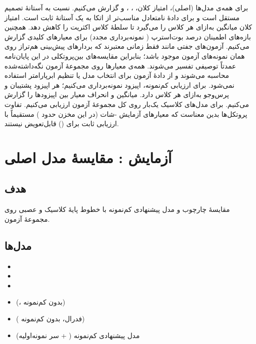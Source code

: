 برای همه‌ی مدل‌ها  (اصلی)، امتیاز  کلان، ، ،  و  گزارش می‌کنیم.  نسبت به آستانۀ تصمیم مستقل است و برای دادۀ نامتعادل مناسب‌تر از اتکا به یک آستانۀ ثابت است. امتیاز  کلان میانگین  به‌ازای هر کلاس را می‌گیرد تا سلطۀ کلاس اکثریت را کاهش دهد. همچنین بازه‌های اطمینان  درصد بوت‌استرپ ( نمونه‌برداری مجدد) برای معیارهای کلیدی گزارش می‌کنیم. آزمون‌های جفتی مانند  فقط زمانی معتبرند که بردارهای پیش‌بینی هم‌تراز روی همان نمونه‌های آزمون موجود باشد؛ بنابراین مقایسه‌های بین‌پروتکلی در این پایان‌نامه عمدتاً توصیفی تفسیر می‌شوند. همه‌ی معیارها روی مجموعۀ آزمون نگه‌داشته‌شده محاسبه می‌شوند و از دادۀ آزمون برای انتخاب مدل یا تنظیم ابرپارامتر استفاده نمی‌شود. برای ارزیابی کم‌نمونه،  اپیزود نمونه‌برداری می‌کنیم؛ هر اپیزود  پشتیبان و  پرس‌وجو به‌ازای هر کلاس دارد. میانگین و انحراف معیار بین اپیزودها را گزارش می‌کنیم. برای مدل‌های کلاسیک یک‌بار روی کل مجموعۀ آزمون ارزیابی می‌کنیم. تفاوت پروتکل‌ها بدین معناست که معیارهای آزمایش -شات (در این مخزن حدود  ) مستقیماً با ارزیابی ثابت  برای \texttt{} () قابل‌تعویض نیستند.

\section{آزمایش : مقایسۀ مدل اصلی}

\subsection{هدف}

مقایسۀ چارچوب  و مدل پیشنهادی کم‌نمونه با خطوط پایۀ کلاسیک و عصبی روی مجموعۀ آزمون.

\subsection{مدل‌ها}

\begin{itemize}
\item \texttt{}
\item \texttt{}
\item \texttt{}
\item \texttt{} (، بدون کم‌نمونه)
\item \texttt{} ( فدرال، بدون کم‌نمونه)
\item مدل پیشنهادی کم‌نمونه ( + سر نمونه‌اولیه)
\end{itemize}

